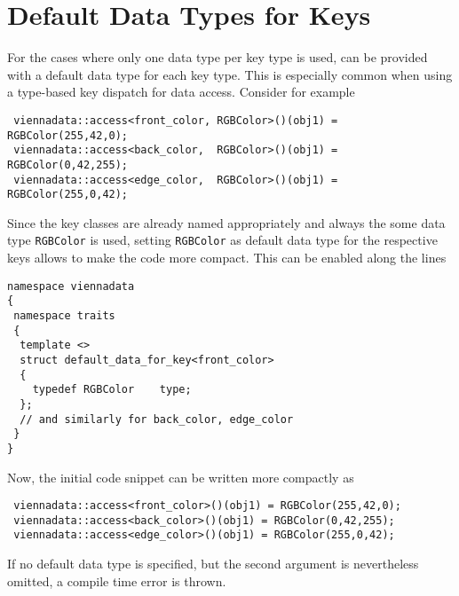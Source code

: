 \section{Default Data Types for Keys} \label{sec:default-valuetype}
For the cases where only one data type per key type is used, {\ViennaData} can be provided with a default data type for each key type.
This is especially common when using a type-based key dispatch for data access. Consider for example
\begin{lstlisting}
 viennadata::access<front_color, RGBColor>()(obj1) = RGBColor(255,42,0);
 viennadata::access<back_color,  RGBColor>()(obj1) = RGBColor(0,42,255);
 viennadata::access<edge_color,  RGBColor>()(obj1) = RGBColor(255,0,42);
\end{lstlisting}
Since the key classes are already named appropriately and always the some data type \lstinline|RGBColor| is used, 
setting \lstinline|RGBColor| as default data type for the respective keys allows to make the code more compact.
This can be enabled along the lines
\begin{lstlisting}
namespace viennadata
{
 namespace traits
 {
  template <>
  struct default_data_for_key<front_color>
  {
    typedef RGBColor    type;
  };
  // and similarly for back_color, edge_color
 }
} 
\end{lstlisting}
Now, the initial code snippet can be written more compactly as
\begin{lstlisting}
 viennadata::access<front_color>()(obj1) = RGBColor(255,42,0);
 viennadata::access<back_color>()(obj1) = RGBColor(0,42,255);
 viennadata::access<edge_color>()(obj1) = RGBColor(255,0,42);
\end{lstlisting}
If no default data type is specified, but the second argument is nevertheless omitted, a compile time error is thrown.